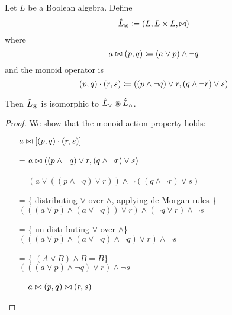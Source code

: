 \begin{prop}
  Let $L$ be a Boolean algebra. Define
  $$\hat{L}_\circledast \coloneqq (L,L \times L,\bowtie)$$
  where
  $$a \bowtie (p, q) \coloneqq (a \vee p) \wedge \neg q$$
  and the monoid operator is
  $$(p, q) \cdot (r, s) \coloneqq ((p \wedge \neg q) \vee r, (q \wedge \neg r) \vee s)$$

  Then $\hat{L}_\circledast$ is isomorphic to $\hat{L}_\vee \circledast \hat{L}_\wedge$.
\end{prop}
\ifproofs
\begin{proof}
  We show that the monoid action property holds:
  \begin{itemize}
    \item[ ]$a \bowtie \left[(p, q) \cdot (r, s)\right]$
    \item[=]$a \bowtie ((p \wedge \neg q) \vee r, (q \wedge \neg r) \vee s)$
    \item[=]$
      \left(
        a \vee
        \left(
          \left(
            p \wedge \neg q
          \right)
          \vee r
        \right)
      \right)
      \wedge \neg
      \left(
        \left(
          q \wedge \neg r
        \right)
        \vee s
      \right)$
    \item[=]\{ distributing $\vee$ over $\wedge$, applying de Morgan rules \}\\
      $
      \left(
        \left(
          \left(  
            a \vee p
          \right)
          \wedge
          \left(
            a \vee \neg q
          \right)
        \right)
        \vee r
      \right)
      \wedge 
      \left(
        \neg q \vee r
      \right)
      \wedge
      \neg s
      $
    \item[=]\{ un-distributing $\vee$ over $\wedge $\}\\
      $
      \left(
        \left(
          \left(  
            a \vee p
          \right)
          \wedge
          \left(
            a \vee \neg q
          \right)
          \wedge
          \neg q
        \right)
        \vee r
      \right)
      \wedge
      \neg s
      $
    \item[=]\{ $(A \vee B) \wedge B = B$\}\\
      $
      \left(
        \left(
          \left(  
            a \vee p
          \right)
          \wedge
          \neg q
        \right)
        \vee r
      \right)
      \wedge
      \neg s
      $
    \item[=]$a \bowtie (p, q) \bowtie (r, s)$
  \end{itemize}
\end{proof}
\fi

